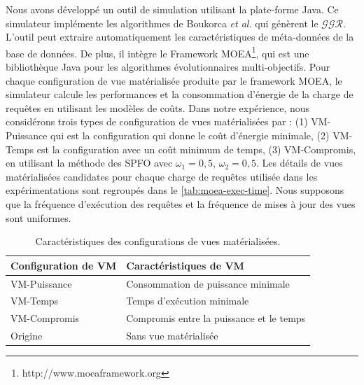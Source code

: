 Nous avons développé un outil de simulation utilisant la plate-forme Java. Ce simulateur implémente les algorithmes de Boukorca \textit{et al.} qui génèrent le $\mathcal{GGR}$. L'outil peut extraire automatiquement les caractéristiques de méta-données de la base de données. De plus, il intègre le Framework MOEA\footnote{http://www.moeaframework.org}, qui est une bibliothèque Java pour les algorithmes évolutionnaires multi-objectifs.
Pour chaque configuration de vue matérialisée produite par le framework MOEA, le simulateur calcule les performances et la consommation d'énergie de la charge de requêtes en utilisant les modèles de coûts. Dans notre expérience, nous considérons trois types de configuration de vues matérialisées par : (1) VM-Puissance qui est la configuration qui donne le coût d'énergie minimale, (2) VM-Temps est la configuration avec un coût minimum de temps, (3) VM-Compromis, en utilisant la méthode des SPFO avec $\omega_1 = 0,5$, $\omega_2 = 0,5$.
Les détails de vues matérialisées candidates pour chaque charge de requêtes utilisée dans les expérimentations sont regroupés dans le \ref{tab:moea-exec-time}. Nous supposons que la fréquence d'exécution des requêtes et la fréquence de mises à jour des vues sont uniformes.

\begin{table}
\centering
\caption {Caractéristiques des configurations de vues matérialisées.} \label{tab:mv-charact}
    \begin{tabular}{ll}
    \toprule
    \textbf{Configuration de VM} & \textbf{Caractéristiques de VM} \\
    \midrule
    VM-Puissance & Consommation de puissance minimale \\
    VM-Temps & Temps d'exécution minimale \\
    VM-Compromis & Compromis entre la puissance et le temps \\
    Origine & Sans vue matérialisée \\ 
    \bottomrule
    \end{tabular}
\end{table}

